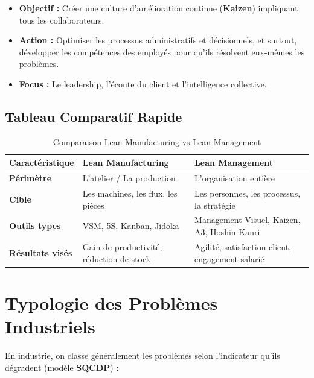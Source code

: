 \documentclass[11pt,a4paper]{article}
\begin{document}
\begin{itemize}[leftmargin=*,itemsep=0.3em]
  \item \textbf{Objectif :} Créer une culture d'amélioration continue (\textbf{Kaizen}) impliquant tous les collaborateurs.
  \item \textbf{Action :} Optimiser les processus administratifs et décisionnels, et surtout, développer les compétences des employés pour qu'ils résolvent eux-mêmes les problèmes.
  \item \textbf{Focus :} Le leadership, l'écoute du client et l'intelligence collective.
\end{itemize}

\subsection{Tableau Comparatif Rapide}

\begin{table}[H]
\centering
\begin{tabular}{@{}>{\bfseries}l>{\raggedright\arraybackslash}p{}>{\raggedright\arraybackslash}p{}@{}}
\toprule
\rowcolor{tableheader}
\color{white}\textbf{Caractéristique} & \color{white}\textbf{Lean Manufacturing} & \color{white}\textbf{Lean Management} \\
\midrule
Périmètre & L'atelier / La production & L'organisation entière \\
\rowcolor{lightgray}
Cible & Les machines, les flux, les pièces & Les personnes, les processus, la stratégie \\
Outils types & VSM, 5S, Kanban, Jidoka & Management Visuel, Kaizen, A3, Hoshin Kanri \\
\rowcolor{lightgray}
Résultats visés & Gain de productivité, réduction de stock & Agilité, satisfaction client, engagement salarié \\
\bottomrule
\end{tabular}
\caption{Comparaison Lean Manufacturing vs Lean Management}
\end{table}

\newpage
\section{Typologie des Problèmes Industriels}

En industrie, on classe généralement les problèmes selon l'indicateur qu'ils dégradent (modèle \textbf{SQCDP}) :
\end{document}
